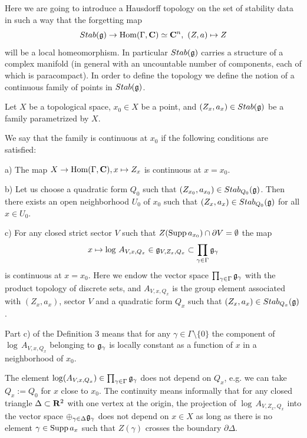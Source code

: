 \documentclass[12pt]{article}
\begin{document}
Here we are going to introduce a Hausdorff topology on the set of stability data in such a way
that the forgetting map 
$$Stab({\mathfrak g})\to \operatorname{Hom}(\Gamma,{\bf C})\simeq {\bf C}^n,\,\, (Z,a)\mapsto Z$$
 will be a local homeomorphism.
In particular $Stab({\mathfrak g})$ carries a structure of a complex manifold (in general with an uncountable number of components, each of which is paracompact). In order to define the topology we define
the notion of a continuous family of points in $Stab({\mathfrak g})$.


Let $X$ be a topological space, $x_0\in X$ be a point, and $(Z_x,a_x)\in Stab({\mathfrak g})$ be a family parametrized by $X$.

\begin{defn} We say that the family is continuous at $x_0$ if the following conditions are satisfied:

a) The map $X\to \operatorname{Hom}(\Gamma,{\bf C}), x\mapsto Z_x$ is continuous at $x=x_0$.

b) Let us choose a quadratic form $Q_0$ such that
$(Z_{x_0},a_{x_0})\in Stab_{Q_0}({\mathfrak g})$. Then there exists an open
neighborhood $U_0$ of $x_0$ such that
$(Z_{x},a_{x})\in Stab_{Q_0}({\mathfrak g})$ for all $x\in U_0$.

c) For any closed strict sector $V$ such that $Z(\operatorname{Supp}a_{x_0})\cap \partial V=\emptyset$ the map
$$x\mapsto \log\,A_{V,x,Q_x}\in {\mathfrak g}_{V,Z_x,Q_x}\subset \prod_{\gamma\in \Gamma}{\mathfrak g}_{\gamma}$$
 is continuous
at $x=x_0$. Here we endow the vector space $\prod_{\gamma\in \Gamma}{\mathfrak g}_{\gamma}$ with the product topology of discrete sets, and $A_{V,x,Q_x}$ is the group element associated with $(Z_x,a_x)$, sector $V$ and a quadratic form $Q_x$ such that 
$(Z_x,a_x)\in Stab_{Q_x}({\mathfrak g})$.


\end{defn}


\begin{rmk} Part c) of the Definition 3 means that for any $\gamma\in \Gamma\setminus\{0\}$ the
component of $\log\,A_{V,x,Q_x}$ belonging to ${\mathfrak g}_{\gamma}$ is locally constant as a function of $x$ in a neighborhood of $x_0$.


\end{rmk}
The element $\log(A_{V,x,Q_x})\in \prod_{\gamma\in \Gamma}{\mathfrak g}_{\gamma}$ does not depend on $Q_x$, e.g. we can take $Q_x:=Q_0$ for $x$ close to $x_0$. 
The continuity means informally that for
any closed triangle $\Delta\subset {\bf R}^2$ with one vertex at the origin, the projection of
$\log\,A_{V,Z_x,Q_x}$ into the vector space $\oplus_{\gamma\in \Delta}{\mathfrak g}_{\gamma}$ does not depend
on $x\in X$ as long as there is no element $\gamma\in \operatorname{Supp}a_x$ such that $Z(\gamma)$ crosses the boundary
$\partial\Delta$.
\end{document}
